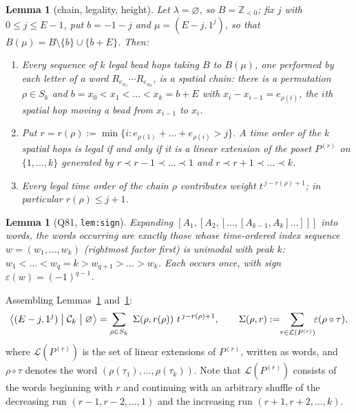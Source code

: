 \documentclass[11pt]{article}
\newtheorem{lemma}[theorem]{Lemma}
\theoremstyle{definition}
\newcommand{\Ck}{\mathcal{C}}
\newcommand{\Z}{\mathbb{Z}}
\begin{document}
\begin{lemma}[chain, legality, height]\label{lem:inherited}
Let $\lambda=\varnothing$, so $B=\Z_{<0}$; fix $j$ with $0\le j\le E-1$, put $b=-1-j$ and
$\mu=(E-j,1^{j})$, so that $B(\mu)=B\setminus\{b\}\cup\{b+E\}$.  Then:
\begin{enumerate}
\item[(a)] Every sequence of $k$ legal bead hops taking $B$ to $B(\mu)$, one performed by
each letter of a word $R_{e_{w_1}}\cdots R_{e_{w_k}}$, is a \emph{spatial chain}: there is
a permutation $\rho\in S_k$ and $b=x_0<x_1<\dots<x_k=b+E$ with $x_i-x_{i-1}=e_{\rho(i)}$,
the $i$th spatial hop moving a bead from $x_{i-1}$ to $x_i$.
\item[(b)] Put $r=r(\rho):=\min\{i:e_{\rho(1)}+\dots+e_{\rho(i)}>j\}$.  A time order of the
$k$ spatial hops is legal if and only if it is a linear extension of the poset $P^{(r)}$
on $\{1,\dots,k\}$ generated by $r\prec r-1\prec\dots\prec1$ and
$r\prec r+1\prec\dots\prec k$.
\item[(c)] Every legal time order of the chain $\rho$ contributes weight
$t^{\,j-r(\rho)+1}$; in particular $r(\rho)\le j+1$.
\end{enumerate}
\end{lemma}

\begin{lemma}[Q81, \texttt{lem:sign}]\label{lem:sign-cited}
Expanding $[A_1,[A_2,[\dots,[A_{k-1},A_k]\dots]]]$ into words, the words occurring are
exactly those whose time-ordered index sequence $w=(w_1,\dots,w_k)$ (rightmost factor
first) is \emph{unimodal with peak $k$}: $w_1<\dots<w_q=k>w_{q+1}>\dots>w_k$.  Each occurs
once, with sign $\varepsilon(w)=(-1)^{q-1}$.
\end{lemma}

Assembling Lemmas~\ref{lem:inherited} and~\ref{lem:sign-cited}:
\begin{equation}\label{eq:master}
  \bigl\langle (E-j,1^j)\bigm|\Ck_k\bigm|\varnothing\bigr\rangle
  =\sum_{\rho\in S_k}\ \Sigma(\rho,r(\rho))\ t^{\,j-r(\rho)+1},
  \qquad
  \Sigma(\rho,r):=\!\!\sum_{\tau\in\mathcal L(P^{(r)})}\!\!\varepsilon(\rho\circ\tau),
\end{equation}
where $\mathcal L(P^{(r)})$ is the set of linear extensions of $P^{(r)}$, written as words,
and $\rho\circ\tau$ denotes the word $(\rho(\tau_1),\dots,\rho(\tau_k))$.  Note that
$\mathcal L(P^{(r)})$ consists of the words beginning with $r$ and continuing with an
arbitrary shuffle of the decreasing run $(r-1,r-2,\dots,1)$ and the increasing run
$(r+1,r+2,\dots,k)$.
\end{document}
